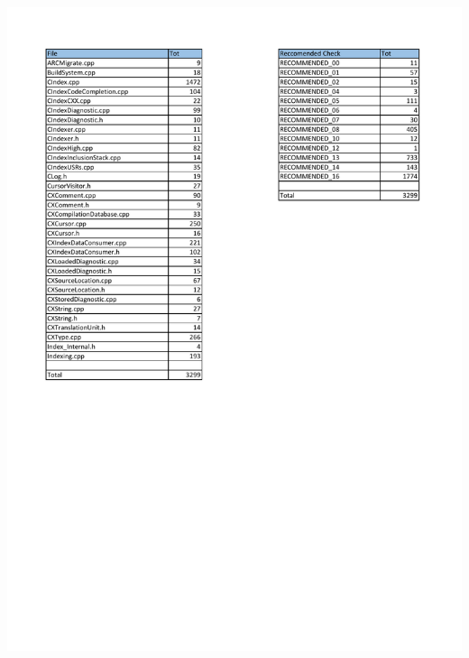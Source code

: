 \begin{minipage}{\linewidth}
	\includegraphics[width=\textwidth]{pdf/SciTools_Summary.pdf}
\end{minipage}

\pagebreak

